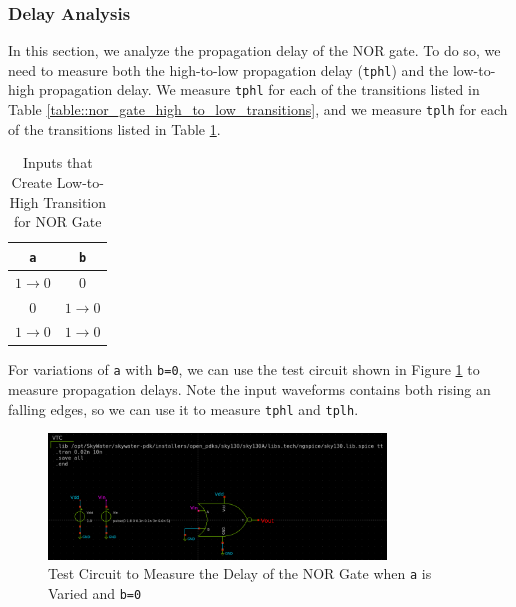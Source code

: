 \documentclass[fleqn]{article}
\begin{document}
	\subsubsection{Delay Analysis}
	
	In this section, we analyze the propagation delay of the NOR gate. To do so, we need to measure both the high-to-low propagation delay (\texttt{tphl}) and the low-to-high propagation delay. We measure \texttt{tphl} for each of the transitions listed in Table \ref{table::nor_gate_high_to_low_transitions}, and we measure \texttt{tplh} for each of the transitions listed in Table \ref{table::nor_gate_low_to_high_transitions}.
	
	\begin{table}[H]
	\begin{center}
	\caption{Inputs that Create Low-to-High Transition for NOR Gate}
	\label{table::nor_gate_low_to_high_transitions}
	\begin{tabular}{| c | c |}
		\hline
		\texttt{a} & \texttt{b} \\
		\hline	
		$1 \rightarrow 0$ & $0$\\
		\hline	
		$0$ & $1 \rightarrow 0$\\
		\hline	
		$1 \rightarrow 0$ & $1 \rightarrow 0$\\
		\hline
	\end{tabular}
	\end{center}
	\end{table}
	
	\noindent For variations of \texttt{a} with \texttt{b=0}, we can use the test circuit shown in Figure \ref{fig::nor_delay_test_sweep_va} to measure propagation delays. Note the input waveforms contains both rising an falling edges, so we can use it to measure \texttt{tphl} and \texttt{tplh}.

	\begin{figure}[H]
		\centerline{\includegraphics[width=0.8\textwidth]{nor_delay_test_sweep_va.png}}
		\caption{Test Circuit to Measure the Delay of the NOR Gate when \texttt{a} is Varied and \texttt{b=0}}
		\label{fig::nor_delay_test_sweep_va}
	\end{figure}
	
\end{document}
